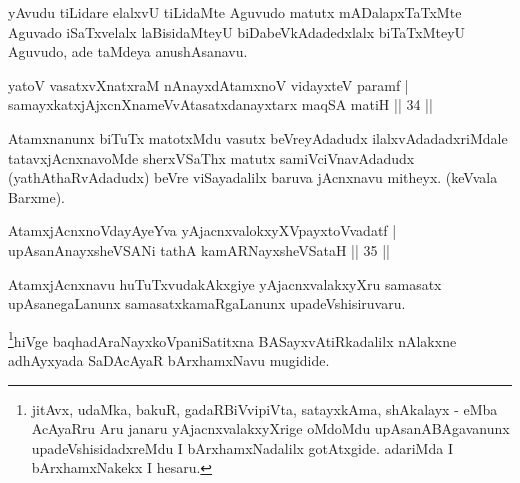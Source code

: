 \begin{artha}
yAvudu tiLidare elalxvU tiLidaMte Aguvudo matutx mADalapxTaTxMte Aguvado iSaTxvelalx laBisidaMteyU biDabeVkAdadedxlalx biTaTxMteyU Aguvudo, ade taMdeya anushAsanavu.
\end{artha}


\begin{shl}
yatoV vasatxvXnatxraM nAnayxdAtamxnoV vidayxteV paramf |\\
samayxkatxjAjxcnXnameVvAtasatxdanayxtarx maqSA matiH \hfill || 34 || 
\end{shl}

\begin{artha}
Atamxnanunx biTuTx matotxMdu vasutx beVreyAdadudx ilalxvAdadadxriMdale tatavxjAcnxnavoMde sherxVSaThx matutx samiVciVnavAdadudx (yathAthaRvAdadudx) beVre viSayadalilx baruva jAcnxnavu mitheyx. (keVvala Barxme).
\end{artha}


\begin{shl}
AtamxjAcnxnoVdayAyeYva yAjacnxvalokxyXV\s payxtoV\s vadatf |\\
upAsanAnayxsheVSANi tathA kamARNayxsheVSataH \hfill || 35 || 
\end{shl}

\begin{artha}
AtamxjAcnxnavu huTuTxvudakAkxgiye yAjacnxvalakxyXru samasatx upAsanegaLanunx samasatxkamaRgaLanunx upadeVshisiruvaru.
\end{artha}

\begin{artha}
\footnote{jitAvx, udaMka, bakuR, gadaRBiVvipiVta, satayxkAma, shAkalayx - eMba AcAyaRru Aru janaru yAjacnxvalakxyXrige oMdoMdu upAsanABAgavanunx upadeVshisidadxreMdu I bArxhamxNadalilx gotAtxgide. adariMda I bArxhamxNakekx I hesaru.}hiVge baqhadAraNayxkoVpaniSatitxna BASayxvAtiRkadalilx nAlakxne adhAyxyada SaDAcAyaR bArxhamxNavu mugidide.
\end{artha}
